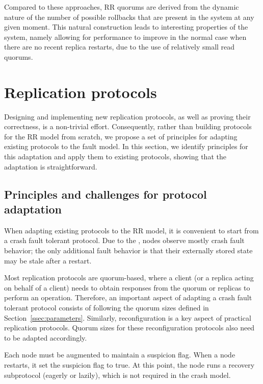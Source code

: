 Compared to these approaches, \ac{RR} quorums are derived from
the dynamic nature of the number of possible rollbacks that are
present in the system at any given moment. This natural
construction leads to interesting properties of the system,
namely allowing for performance to improve in the normal case
when there are no recent replica restarts, due to the use of
relatively small read quorums.

\section{Replication protocols}\label{sec:protocol}

Designing and implementing new replication protocols, as well as
proving their correctness, is a non-trivial effort. Consequently,
rather than building protocols for the \ac{RR} model from
scratch, we propose a set of principles for adapting existing
protocols to the fault model. In this section, we identify
principles for this adaptation and apply them to existing
protocols, showing that the adaptation is straightforward.

\subsection{Principles and challenges for protocol adaptation}\label{ssec:adaptation}

When adapting existing protocols to the \ac{RR} model, it is
convenient to start from a crash fault tolerant protocol.
Due to the , nodes observe mostly crash fault behavior; the only
additional fault behavior is that their externally stored state
may be stale after a restart.

Most replication protocols are quorum-based, where a client (or a
replica acting on behalf of a client) needs to obtain responses
from the quorum or replicas to perform an operation.  Therefore,
an important aspect of adapting a crash fault tolerant protocol
consists of following the quorum sizes defined in
Section~\ref{ssec:parameters}. Similarly, reconfiguration is a
key aspect of practical replication protocols. Quorum sizes for
these reconfiguration protocols also need to be adapted
accordingly.

Each node must be augmented to maintain a suspicion flag. When a node
restarts, it set the suspicion flag to true. At this point, the node
runs a recovery subprotocol (eagerly or lazily), which is not required
in the crash model.

